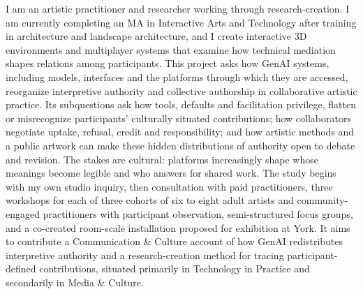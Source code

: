 I am an artistic practitioner and researcher working through
research-creation. I am currently completing an MA in Interactive Arts and
Technology after training in architecture and landscape architecture, and I
create interactive 3D environments and multiplayer systems that examine how
technical mediation shapes relations among participants. This project asks
how GenAI systems, including models, interfaces and the platforms through
which they are accessed, reorganize interpretive authority and collective
authorship in collaborative artistic practice. Its subquestions ask how
tools, defaults and facilitation privilege, flatten or misrecognize
participants' culturally situated contributions; how collaborators negotiate
uptake, refusal, credit and responsibility; and how artistic methods and a
public artwork can make these hidden distributions of authority open to
debate and revision. The stakes are cultural: platforms increasingly
shape whose meanings become legible and who answers for shared work. The study begins with my own studio inquiry, then
consultation with paid practitioners, three workshops for each of three
cohorts of six to eight adult artists and community-engaged practitioners
with participant observation, semi-structured focus groups, and a co-created
room-scale installation proposed for exhibition at York. It aims to
contribute a Communication \& Culture account of how GenAI redistributes
interpretive authority and a research-creation method for tracing
participant-defined contributions, situated primarily in Technology in
Practice and secondarily in Media \& Culture.
